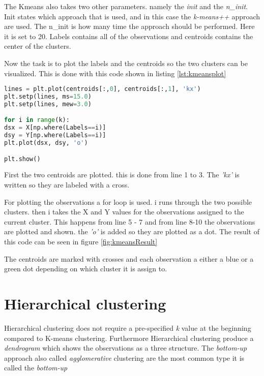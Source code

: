 The Kmeans also takes two other parameters. namely the \emph{init} and the \emph{n\_init}. Init states which approach that is used, and in this case the \emph{k-means++} approach are used. The n\_init is how many time the approach should be performed. Here it is set to 20.
Labels contains all of the observations and centroids contains the center of the clusters.

Now the task is to plot the labels and the centroids so the two clusters can be visualized. 
This is done with this code shown in listing \ref{lst:kmeansplot}

\begin{lstlisting}[language=Python, label=lst:kmeansplot, caption=The code for plotting the two clusters]
lines = plt.plot(centroids[:,0], centroids[:,1], 'kx')
plt.setp(lines, ms=15.0)
plt.setp(lines, mew=3.0)

for i in range(k):
dsx = X[np.where(Labels==i)]
dsy = Y[np.where(Labels==i)]
plt.plot(dsx, dsy, 'o')

plt.show()
\end{lstlisting}

First the two centroids are plotted. this is done from line 1 to 3. The \emph{'kx'} is written so they are labeled with a cross.

For plotting the observations a for loop is used. i runs through the two possible clusters. then i takes the X and Y values for the observations assigned to the current cluster. This happens from line 5 - 7 and from line 8-10 the observations are plotted and shown. the \emph{'o'} is added so they are plotted as a dot. 
The result of this code can be seen in figure \ref{fig:kmeansResult}


The centroids are marked with crosses and each observation a either a blue or a green dot depending on which cluster it is assign to.


\section{Hierarchical clustering}
 Hierarchical clustering does not require a pre-specified \emph{k} value at the beginning compared to K-means clustering.
Furthermore Hierarchical clustering produce a \emph{dendrogram} which shows the observations as a three structure.
The \emph{bottom-up} approach also called \emph{agglomerative} clustering are the most common type it is called the \emph{bottom-up}

